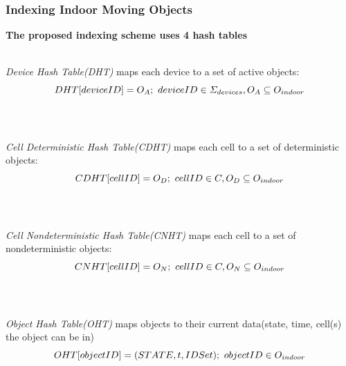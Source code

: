 \begin{frame}
\frametitle{Indexing Indoor Moving Objects}

\textbf{The proposed indexing scheme uses 4 hash tables}
\\~\\
\pause

\footnotesize{
\emph{Device Hash Table(DHT)} maps each device to a set of active objects:
\pause
$$\mathnormal{DHT[deviceID] = O_A;~deviceID \in \Sigma_{devices}, O_A \subseteq O_{indoor}}$$
\\~\\
\pause

\emph{Cell Deterministic Hash Table(CDHT)} maps each cell to a set of deterministic objects:
\pause
$$\mathnormal{CDHT[cellID] = O_D;~cellID \in C, O_D \subseteq O_{indoor}}$$
\\~\\
\pause

\emph{Cell Nondeterministic Hash Table(CNHT)} maps each cell to a set of nondeterministic objects:
\pause
$$\mathnormal{CNHT[cellID] = O_N;~cellID \in C, O_N \subseteq O_{indoor}}$$
\\~\\
\pause

\emph{Object Hash Table(OHT)} maps objects to their current data(state, time, cell(s) the object can be in)
\pause
$$\mathnormal{OHT[objectID] = (STATE, t, IDSet);~objectID \in O_{indoor}}$$
\\~\\
\pause
}

\end{frame}


